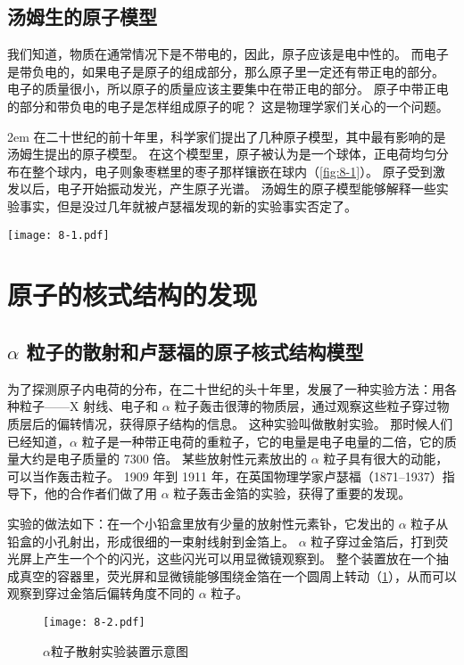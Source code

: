 \subsection{汤姆生的原子模型}
我们知道，物质在通常情况下是不带电的，因此，原子应该是电中性的。
而电子是带负电的，如果电子是原子的组成部分，那么原子里一定还有带正电的部分。
电子的质量很小，所以原子的质量应该主要集中在带正电的部分。
原子中带正电的部分和带负电的电子是怎样组成原子的呢？
这是物理学家们关心的一个问题。

\bigskip\noindent
\begin{minipage}{0.5\linewidth}\parindent2em
在二十世纪的前十年里，科学家们提出了几种原子模型，其中最有影响的是汤姆生提出的原子模型。
在这个模型里，原子被认为是一个球体，正电荷均匀分布在整个球内，电子则象枣糕里的枣子那样镶嵌在球内（\cref{fig:8-1}）。
原子受到激发以后，电子开始振动发光，产生原子光谱。
汤姆生的原子模型能够解释一些实验事实，但是没过几年就被卢瑟福发现的新的实验事实否定了。
\end{minipage}
\begin{minipage}{0.48\linewidth}
\begin{figurehere}
  \texttt{[image: 8-1.pdf]}
  \caption{汤姆生的原子模型}\label{fig:8-1}
\end{figurehere}
\end{minipage}

\section{原子的核式结构的发现}
\subsection{\texorpdfstring{$\alpha$}{a} 粒子的散射和卢瑟福的原子核式结构模型}
为了探测原子内电荷的分布，在二十世纪的头十年里，发展了一种实验方法：用各种粒子——X 射线、电子和 $\alpha$ 粒子轰击很薄的物质层，通过观察这些粒子穿过物质层后的偏转情况，获得原子结构的信息。
这种实验叫做散射实验。
那时候人们已经知道，$\alpha$ 粒子是一种带正电荷的重粒子，它的电量是电子电量的二倍，它的质量大约是电子质量的 7300 倍。
某些放射性元素放出的 $\alpha$ 粒子具有很大的动能，可以当作轰击粒子。
1909 年到 1911 年，在英国物理学家卢瑟福（1871--1937）指导下，他的合作者们做了用 $\alpha$ 粒子轰击金箔的实验，获得了重要的发现。

实验的做法如下：在一个小铅盒里放有少量的放射性元素钋，它发出的 $\alpha$ 粒子从铅盒的小孔射出，形成很细的一束射线射到金箔上。
$\alpha$ 粒子穿过金箔后，打到荧光屏上产生一个个的闪光，这些闪光可以用显微镜观察到。
整个装置放在一个抽成真空的容器里，荧光屏和显微镜能够围绕金箔在一个圆周上转动（\cref{fig:8-2}），从而可以观察到穿过金箔后偏转角度不同的 $\alpha$ 粒子。
\begin{figure}
  \texttt{[image: 8-2.pdf]}
  \caption{$\alpha$粒子散射实验装置示意图}\label{fig:8-2}
\end{figure}

